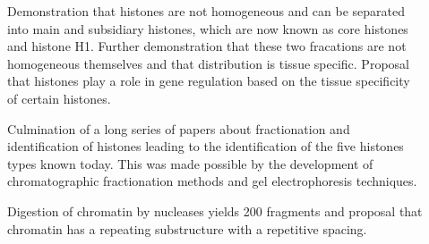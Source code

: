 {\begin{shaded}
\begin{description}
          \item[\cite{stedman1951main-histones-separation}]
            Demonstration that histones are not homogeneous and can be
            separated into main and subsidiary histones,
            which are now known as core histones and histone H1.
            Further demonstration that these two fracations are not
            homogeneous themselves and that distribution is tissue specific.
            Proposal that histones play a role in gene regulation based
            on the tissue specificity of certain histones.

          \item[\cite{philips-and-johns1965-fractionation}]
            Culmination of a long series of papers about fractionation and
            identification of histones leading to the identification of
            the five histones types known today.
            This was made possible by the development of chromatographic
            fractionation methods and gel electrophoresis techniques.

          \item[\cite{hewish1973-200bp-pieces}]
            Digestion of chromatin by nucleases yields \SI{200}{\bp}
            fragments and proposal that chromatin has a repeating
            substructure with a repetitive spacing.


\end{description}
\end{shaded}}

